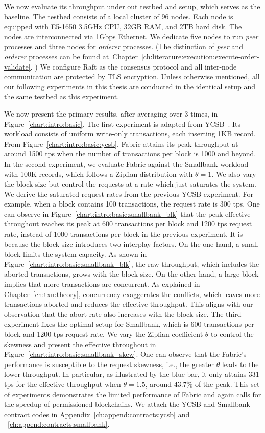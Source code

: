 We now evaluate its throughput under out testbed and setup, which serves as the baseline. 
The testbed consists of a local cluster of 96 nodes. Each node is equipped with E5-1650 3.5GHz CPU, 32GB RAM, and 2TB hard disk. The nodes are interconnected via 1Gbps Ethernet. 
We dedicate five nodes to run \textit{peer} processes and three nodes for \textit{orderer} processes. 
(The distinction of \textit{peer} and \textit{orderer} processes can be found at~Chapter~\ref{ch:literature:execution:execute-order-validate}.  )
We configure Raft as the consensus protocol and all inter-node communication are protected by TLS encryption. 
Unless otherwise mentioned, all our following experiments in this thesis are conducted in the identical setup and the same testbed as this experiment.

We now present the primary results, after averaging over 3 times, in Figure~\ref{chart:intro:basic}. 
The first experiment is adapted from YCSB~\cite{cooper2010benchmarking}. 
Its workload consists of uniform write-only transactions, each inserting 1KB record. 
From Figure~\ref{chart:intro:basic:ycsb}, Fabric attains its peak throughput at around 1500 tps when the number of transactions per block is 1000 and beyond. 
In the second experiment, we evaluate Fabric against the Smallbank workload with 100K records, which follows a Zipfian distribution with $\theta=1$. 
We also vary the block size but control the requests at a rate which just saturates the system. 
We derive the saturated request rates from the previous YCSB experiment. 
For example, when a block contains 100 transactions, the request rate is 300 tps.
One can observe in Figure~\ref{chart:intro:basic:smallbank_blk} that the peak effective throughout reaches its peak at 600 transactions per block and 1200 tps request rate, instead of 1000 transactions per block in the previous experiment. 
It is because the block size introduces two interplay factors. 
On the one hand, a small block limits the system capacity.
As shown in Figure~\ref{chart:intro:basic:smallbank_blk}, the raw throughput, which includes the aborted transactions, grows with the block size. 
On the other hand, a large block implies that more transactions are concurrent. 
As explained in Chapter~\ref{ch:txn:theory}, concurrency exaggerates the conflicts, which leaves more transactions aborted and reduces the effective throughput. 
This aligns with our observation that the abort rate also increases with the block size.
The third experiment fixes the optimal setup for Smallbank, which is 600 transactions per block and 1200 tps request rate. 
We vary the Zipfian coefficient $\theta$ to control the skewness and present the effective throughout in Figure~\ref{chart:intro:basic:smallbank_skew}. 
One can observe that the Fabric's performance is susceptible to the request skewness, i.e., the greater $\theta$ leads to the lower throughput. 
In particular, as illustrated by the blue bar, it only attains 331 tps for the effective throughput when $\theta=1.5$, around 43.7\% of the peak. 
This set of experiments demonstrates the limited performance of Fabric and again calls for the speedup of permissioned blockchains. 
We attach the YCSB and Smallbank contract codes in Appendix~\ref{ch:append:contracts:ycsb} and ~\ref{ch:append:contracts:smallbank}. 

